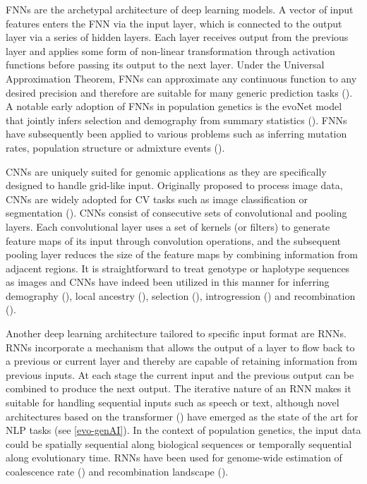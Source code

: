 \Acp{FNN} are the archetypal architecture of deep learning models. A vector of input features enters the \ac{FNN} via the input layer, which is connected to the output layer via a series of hidden layers. Each layer receives output from the previous layer and applies some form of non-linear transformation through activation functions before passing its output to the next layer. Under the Universal Approximation Theorem, \acp{FNN} can approximate any continuous function to any desired precision and therefore are suitable for many generic prediction tasks (\cite{korfmann_deep_2023}). A notable early adoption of \acp{FNN} in population genetics is the evoNet model that jointly infers selection and demography from summary statistics (\cite{sheehan_deep_2016}). \acp{FNN} have subsequently been applied to various problems such as inferring mutation rates, population structure or admixture events (\cite{huang_harnessing_2023}).

\Acfp{CNN} are uniquely suited for genomic applications as they are specifically designed to handle grid-like input. Originally proposed to process image data, \acp{CNN} are widely adopted for \ac{CV} tasks such as image classification or segmentation (\cite{lecun_deep_2015}). \acp{CNN} consist of consecutive sets of convolutional and pooling layers. Each convolutional layer uses a set of kernels (or filters) to generate feature maps of its input through convolution operations, and the subsequent pooling layer reduces the size of the feature maps by combining information from adjacent regions. It is straightforward to treat genotype or haplotype sequences as images and \acp{CNN} have indeed been utilized in this manner for inferring demography (\cite{flagel_unreasonable_2019,sanchez2021deep}), local ancestry (\cite{montserrat2020lai,sabat2022salai}), selection (\cite{flagel_unreasonable_2019,torada_imagene_2019}), introgression (\cite{blischak2021chromosome,gower2021detecting,ray2023introunet,zhang2023inferring}) and recombination (\cite{adrion_predicting_2020}).

Another deep learning architecture tailored to specific input format are \acfp{RNN}. \acp{RNN} incorporate a mechanism that allows the output of a layer to flow back to a previous or current layer and thereby are capable of retaining information from previous inputs. At each stage the current input and the previous output can be combined to produce the next output. The iterative nature of an \ac{RNN} makes it suitable for handling sequential inputs such as speech or text, although novel architectures based on the transformer (\cite{attention2017_3f5ee243}) have emerged as the state of the art for \ac{NLP} tasks (see \ref{evo-genAI}). In the context of population genetics, the input data could be spatially sequential along biological sequences or temporally sequential along evolutionary time. \acp{RNN} have been used for genome-wide estimation of coalescence rate (\cite{khomutov2021deep}) and recombination landscape (\cite{adrion_predicting_2020}).

